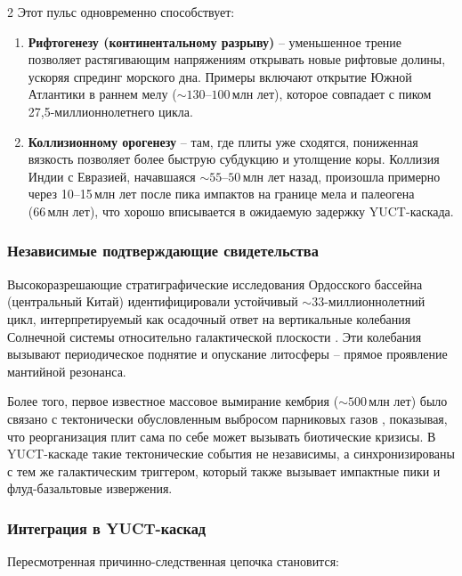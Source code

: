 \documentclass[11pt,a4paper]{article}
\begin{document}
\begin{multicols}{2}
		Этот пульс одновременно способствует:
		
		\begin{enumerate}
			\item \textbf{Рифтогенезу (континентальному разрыву)} – уменьшенное трение позволяет
			растягивающим напряжениям открывать новые рифтовые долины, ускоряя спрединг морского дна.
			Примеры включают открытие Южной Атлантики в раннем мелу
			(\(\sim 130\)–\(100\) млн лет), которое совпадает с пиком 27,5-миллионнолетнего цикла.
			\item \textbf{Коллизионному орогенезу} – там, где плиты уже сходятся, пониженная
			вязкость позволяет более быструю субдукцию и утолщение коры.
			Коллизия Индии с Евразией, начавшаяся \(\sim 55\)–\(50\) млн лет назад, произошла примерно
			через 10–15 млн лет после пика импактов на границе мела и палеогена (66 млн лет), что хорошо вписывается в ожидаемую задержку YUCT-каскада.
		\end{enumerate}
		
		\subsubsection{Независимые подтверждающие свидетельства}
		
		Высокоразрешающие стратиграфические исследования Ордосского бассейна (центральный Китай) идентифицировали устойчивый
		\(\sim 33\)-миллионнолетний цикл, интерпретируемый как осадочный ответ на вертикальные
		колебания Солнечной системы относительно галактической плоскости \cite{Rampino2021}.
		Эти колебания вызывают периодическое поднятие и опускание литосферы – прямое
		проявление мантийной резонанса.
		
		Более того, первое известное массовое вымирание кембрия (\(\sim 500\) млн лет) было
		связано с тектонически обусловленным выбросом парниковых газов \cite{Jablonski1991}, показывая, что
		реорганизация плит сама по себе может вызывать биотические кризисы. В YUCT-каскаде такие
		тектонические события не независимы, а синхронизированы с тем же галактическим триггером, который также вызывает импактные пики и флуд-базальтовые извержения.
		
		\subsubsection{Интеграция в YUCT-каскад}
		
		Пересмотренная причинно-следственная цепочка становится:
		
	\end{multicols}
	
\end{document}
